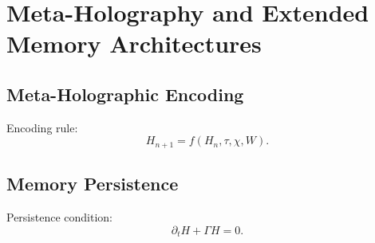 \chapter{Meta-Holography and Extended Memory Architectures}

\section{Meta-Holographic Encoding}
Encoding rule:
\[
H_{n+1} = f(H_n,\tau,\chi,W).
\]

\section{Memory Persistence}
Persistence condition:
\[
\partial_t H + \Gamma H = 0.
\]

